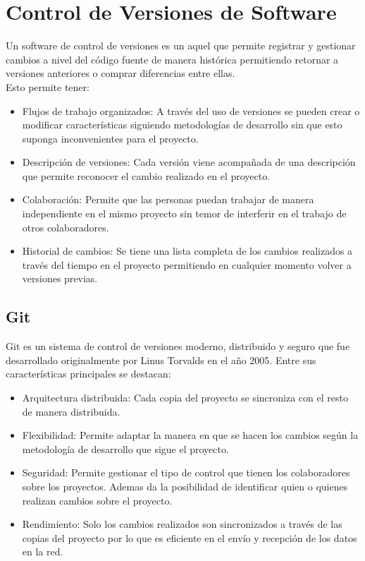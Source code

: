 \section{Control de Versiones de Software}
Un software de control de versiones es un aquel que permite registrar y gestionar cambios a nivel del código fuente de manera histórica permitiendo retornar a versiones anteriores o comprar diferencias entre ellas.\\

Esto permite tener:
\begin{itemize}
\item Flujos de trabajo organizados: A través del uso de versiones se pueden crear o modificar características siguiendo metodologías de desarrollo sin que esto suponga inconvenientes para el proyecto.
\item Descripción de versiones: Cada versión viene acompañada de una descripción que permite reconocer el cambio realizado en el proyecto.
\item Colaboración: Permite que las personas puedan trabajar de manera independiente en el mismo proyecto sin temor de interferir en el trabajo de otros colaboradores.
\item Historial de cambios: Se tiene una lista completa de los cambios realizados a través del tiempo en el proyecto permitiendo en cualquier momento volver a versiones previas.
\end{itemize}

\subsection{Git}
Git es un sistema de control de versiones moderno, distribuido y seguro que fue desarrollado originalmente por Linus Torvalds en el año 2005. Entre sus características principales se destacan:
\begin{itemize}
\item Arquitectura distribuida: Cada copia del proyecto se sincroniza con el resto de manera distribuida.
\item Flexibilidad: Permite adaptar la manera en que se hacen los cambios según la metodología de desarrollo que sigue el proyecto. 
\item Seguridad: Permite gestionar el tipo de control que tienen los colaboradores sobre los proyectos. Ademas da la posibilidad de identificar quien o quienes realizan cambios sobre el proyecto.
\item Rendimiento: Solo los cambios realizados son sincronizados a través de las copias del proyecto por lo que es eficiente en el envío y recepción de los datos en la red. 
\end{itemize}

